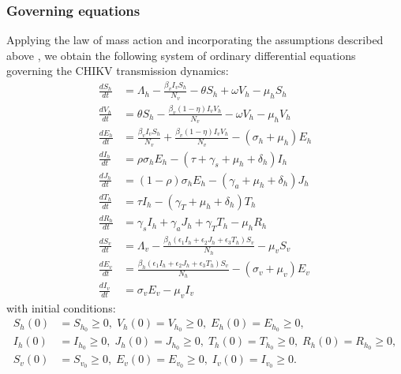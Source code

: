 \documentclass[9pt]{article}
\numberwithin{equation}{section}
\begin{document}
\subsubsection{Governing equations}
Applying the law of mass action and incorporating the assumptions described above \cite{wilson}, we obtain the following system of ordinary differential equations governing the CHIKV transmission dynamics:
\begin{equation}\label{eqn1}
    \begin{aligned}
        \frac{dS_h}{dt}&=\Lambda_h - \frac{\beta_vI_vS_h}{N_v} - \theta S_h + \omega V_h - \mu_h S_h \\
        \frac{dV_h}{dt}&=\theta S_h - \frac{\beta_v(1-\eta)I_vV_h}{N_v} - \omega V_h - \mu_h V_h \\
        \frac{dE_h}{dt}&=\frac{\beta_vI_vS_h}{N_v} + \frac{\beta_v(1-\eta)I_vV_h}{N_v} - (\sigma_h+\mu_h)E_h \\
        \frac{dI_h}{dt}&=\rho\sigma_hE_h - (\tau+\gamma_s+\mu_h+\delta_h)I_h \\
        \frac{dJ_h}{dt}&=(1-\rho)\sigma_hE_h - (\gamma_a+\mu_h+\delta_h)J_h \\
        \frac{dT_h}{dt}&=\tau I_h - (\gamma_T+\mu_h+\delta_h)T_h \\
        \frac{dR_h}{dt}&=\gamma_sI_h + \gamma_aJ_h + \gamma_TT_h - \mu_hR_h \\
        \frac{dS_v}{dt}&=\Lambda_v - \frac{\beta_h(\epsilon_1I_h+\epsilon_2J_h+\epsilon_3T_h)S_v}{N_h} - \mu_v S_v \\
        \frac{dE_v}{dt}&=\frac{\beta_h(\epsilon_1I_h+\epsilon_2J_h+\epsilon_3T_h)S_v}{N_h} - (\sigma_v + \mu_v)E_v \\
        \frac{dI_v}{dt}&=\sigma_v E_v - \mu_v I_v
    \end{aligned}
\end{equation}
with initial conditions:
\begin{align}\label{eqn2}\nonumber
    S_h(0)&=S_{h_0}\geq0,\; V_h(0)=V_{h_0}\geq0,\; E_h(0)=E_{h_0}\geq0,\\
    I_h(0)&=I_{h_0}\geq0,\; J_h(0)=J_{h_0}\geq0,\; T_h(0)=T_{h_0}\geq0,\; R_h(0)=R_{h_0}\geq0,\\\nonumber
    S_v(0)&=S_{v_0}\geq0,\; E_v(0)=E_{v_0}\geq0,\; I_v(0)=I_{v_0}\geq0.
\end{align}
\end{document}
